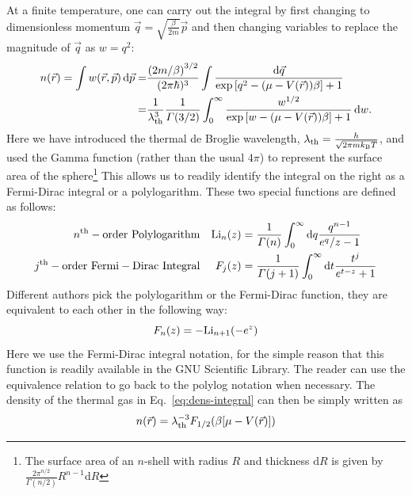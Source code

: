At a finite temperature, one can carry out the integral by first changing to
dimensionless momentum $\vec{q} = \sqrt{\frac{\beta}{2m}}\vec{p}$ and then
changing variables to replace the magnitude of $\vec{q}$ as $w=q^{2}$:
\begin{equation}
\begin{split}
  n(\vec{r}) =  \int w(\vec{r},\vec{p}) \,\mathrm{d}\vec{p}  = &
  \frac{\left( 2m/\beta \right)^{3/2}}{(2\pi\hbar)^{3}} 
    \int \frac{\mathrm{d}\vec{q}}{\exp\left[ q^{2} - (\mu -V(\vec{r}))\beta \right] + 1 } \\
   =  &
  \frac{1}{ \lambda_{\mathrm{th}} ^{3}}  \frac{ 1 } { \Gamma(3/2)} 
  \int_{0}^{\infty} 
   \frac{w^{1/2}}{\exp\left[ w - (\mu - V(\vec{r}))\beta \right] +1 } 
   \,\mathrm{d} w.
\end{split}
\label{eq:dens-integral}
\end{equation}
Here we have introduced the thermal de Broglie wavelength, $ \lambda_{\mathrm{th}}  =
\frac{h}{\sqrt{2\pi m k_{\mathrm{B}} T}}$, and used the Gamma function (rather than the
usual $4\pi$) to represent the surface area of the sphere\footnote{The surface
area of an $n$-shell with radius $R$ and thickness $\mathrm{d}R$ is given by
$\frac{2 \pi^{n/2}}{\Gamma(n/2)} R^{n-1} \mathrm{d} R$} This allows us to
readily identify the integral on the right as a Fermi-Dirac integral or a
polylogarithm.  These two special functions are defined as follows:  
\begin{align} 
  n^{\mathrm{th}}-\mathrm{order\ Polylogarithm} & &  
    \mathrm{Li} _{n} (z) &= \frac{1}{\Gamma(n)} 
   \int_{0}^{\infty} \mathrm{d} q \frac{ q ^{n-1} }{ e^{q}/z -1 } \\
  j^{\mathrm{th}}-\mathrm{order\ Fermi-Dirac\ Integral} &  &   
    F_{j}(z) &=  \frac{1}{\Gamma(j+1)} 
   \int_{0}^{\infty} \mathrm{d} t  \frac{ t^{j} } { e^{t-z} + 1}  \\
\end{align}
Different authors pick the polylogarithm or the Fermi-Dirac function,  they are
equivalent to each other in the following way:
\begin{equation}
  F_{n}(z) = - \mathrm{Li} _{n+1}(-e^{z}) 
\end{equation}
Here we use the Fermi-Dirac integral notation, for the simple reason that this
function is readily available in the GNU Scientific Library.  The reader can
use the equivalence relation to go back to the polylog notation when necessary.
The density of the thermal gas in Eq.~\ref{eq:dens-integral} can then be simply
written as
\begin{equation}
n(\vec{r}) =  \lambda_{\mathrm{th}} ^{-3} F_{1/2}( \beta[\mu - V(\vec{r})])
\label{eq:dens-fermi} 
\end{equation}

